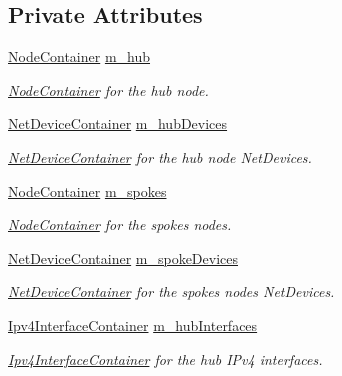 \subsection*{Private Attributes}
\begin{DoxyCompactItemize}
\item 
\hyperlink{classns3_1_1NodeContainer}{Node\+Container} \hyperlink{classns3_1_1CsmaStarHelper_aecaadf8dc16e86d58b4465241132a4ab}{m\+\_\+hub}
\begin{DoxyCompactList}\small\item\em \hyperlink{classns3_1_1NodeContainer}{Node\+Container} for the hub node. \end{DoxyCompactList}\item 
\hyperlink{classns3_1_1NetDeviceContainer}{Net\+Device\+Container} \hyperlink{classns3_1_1CsmaStarHelper_a9fa2bab77d1e500e7816d5083e67e860}{m\+\_\+hub\+Devices}
\begin{DoxyCompactList}\small\item\em \hyperlink{classns3_1_1NetDeviceContainer}{Net\+Device\+Container} for the hub node Net\+Devices. \end{DoxyCompactList}\item 
\hyperlink{classns3_1_1NodeContainer}{Node\+Container} \hyperlink{classns3_1_1CsmaStarHelper_a30e9ab531c8e1148f016d11dc0d9cd11}{m\+\_\+spokes}
\begin{DoxyCompactList}\small\item\em \hyperlink{classns3_1_1NodeContainer}{Node\+Container} for the spokes nodes. \end{DoxyCompactList}\item 
\hyperlink{classns3_1_1NetDeviceContainer}{Net\+Device\+Container} \hyperlink{classns3_1_1CsmaStarHelper_a25fa6c312294c1577a5f29f153600f33}{m\+\_\+spoke\+Devices}
\begin{DoxyCompactList}\small\item\em \hyperlink{classns3_1_1NetDeviceContainer}{Net\+Device\+Container} for the spokes nodes Net\+Devices. \end{DoxyCompactList}\item 
\hyperlink{classns3_1_1Ipv4InterfaceContainer}{Ipv4\+Interface\+Container} \hyperlink{classns3_1_1CsmaStarHelper_aa162645113120efa8337221224b4dafa}{m\+\_\+hub\+Interfaces}
\begin{DoxyCompactList}\small\item\em \hyperlink{classns3_1_1Ipv4InterfaceContainer}{Ipv4\+Interface\+Container} for the hub I\+Pv4 interfaces. \end{DoxyCompactList}\item 

\end{DoxyCompactItemize}
